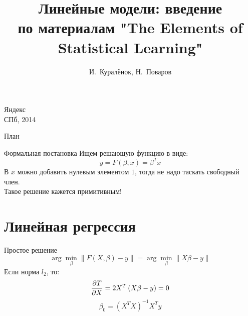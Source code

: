 \documentclass[14pt, fleqn, xcolor={dvipsnames, table}]{beamer}
\title{Линейные модели: введение\\\small{по материалам "The Elements of Statistical Learning"}}
\author[]{\small{%
И.~Куралёнок,
Н.~Поваров}}
\date{}
\begin{document}
\begin{frame}
\maketitle
\small
\begin{center}
\vspace{-60pt}
\normalsize {\color{red}Я}ндекс \\
\vspace{80pt}
\footnotesize СПб, 2014
\end{center}
\end{frame}


\begin{frame}{План}
\tableofcontents
\end{frame}

\begin{frame}{Формальная постановка}
Ищем решающую функцию в виде:
$$
y = F(\beta, x) = \beta^T x
$$
В $x$ можно добавить нулевым элементом $1$, тогда не надо таскать свободный член. \\
Такое решение кажется примитивным! \\
\end{frame}

\section{Линейная регрессия}
\begin{frame}{Простое решение}
$$
\arg \min_{\beta} \|F(X, \beta) - y\| = \arg \min_{\beta} \|X \beta - y\|
$$
Если норма $l_2$, то:
$$
{\partial T \over \partial X} = 2 X^T\left(X\beta - y\right) = 0
$$
$$
\beta_0 = (X^TX)^{-1}X^Ty
$$
\end{frame}
\end{document}
